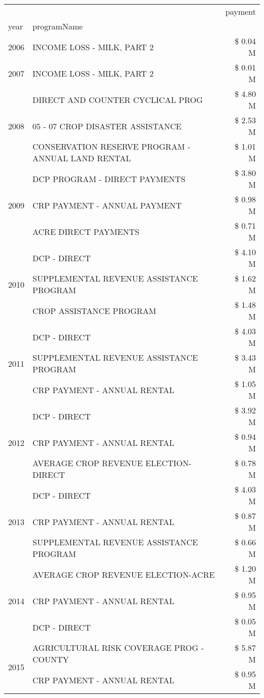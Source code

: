 \begin{tabular}{llr}
\toprule
 &  & payment \\
year & programName &  \\
\midrule
2006 & INCOME LOSS - MILK, PART 2 & \$ 0.04 M \\
\cline{1-3}
2007 & INCOME LOSS - MILK, PART 2 & \$ 0.01 M \\
\cline{1-3}
\multirow[t]{3}{*}{2008} & DIRECT AND COUNTER CYCLICAL PROG & \$ 4.80 M \\
 & 05 - 07 CROP DISASTER ASSISTANCE & \$ 2.53 M \\
 & CONSERVATION RESERVE PROGRAM - ANNUAL LAND RENTAL & \$ 1.01 M \\
\cline{1-3}
\multirow[t]{3}{*}{2009} & DCP PROGRAM - DIRECT PAYMENTS & \$ 3.80 M \\
 & CRP PAYMENT - ANNUAL PAYMENT & \$ 0.98 M \\
 & ACRE DIRECT PAYMENTS & \$ 0.71 M \\
\cline{1-3}
\multirow[t]{3}{*}{2010} & DCP - DIRECT & \$ 4.10 M \\
 & SUPPLEMENTAL REVENUE ASSISTANCE PROGRAM & \$ 1.62 M \\
 & CROP ASSISTANCE PROGRAM & \$ 1.48 M \\
\cline{1-3}
\multirow[t]{3}{*}{2011} & DCP - DIRECT & \$ 4.03 M \\
 & SUPPLEMENTAL REVENUE ASSISTANCE PROGRAM & \$ 3.43 M \\
 & CRP PAYMENT - ANNUAL RENTAL & \$ 1.05 M \\
\cline{1-3}
\multirow[t]{3}{*}{2012} & DCP - DIRECT & \$ 3.92 M \\
 & CRP PAYMENT - ANNUAL RENTAL & \$ 0.94 M \\
 & AVERAGE CROP REVENUE ELECTION-DIRECT & \$ 0.78 M \\
\cline{1-3}
\multirow[t]{3}{*}{2013} & DCP - DIRECT & \$ 4.03 M \\
 & CRP PAYMENT - ANNUAL RENTAL & \$ 0.87 M \\
 & SUPPLEMENTAL REVENUE ASSISTANCE PROGRAM & \$ 0.66 M \\
\cline{1-3}
\multirow[t]{3}{*}{2014} & AVERAGE CROP REVENUE ELECTION-ACRE & \$ 1.20 M \\
 & CRP PAYMENT - ANNUAL RENTAL & \$ 0.95 M \\
 & DCP - DIRECT & \$ 0.05 M \\
\cline{1-3}
\multirow[t]{3}{*}{2015} & AGRICULTURAL RISK COVERAGE PROG - COUNTY & \$ 5.87 M \\
 & CRP PAYMENT - ANNUAL RENTAL & \$ 0.95 M \\

\end{tabular}
